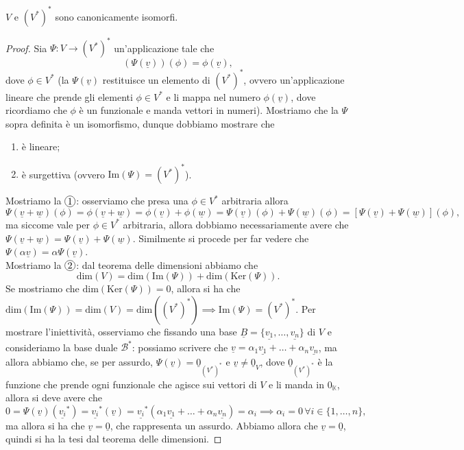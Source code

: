 \begin{theorem}
    $V$ e $(V^*)^*$ sono canonicamente isomorfi.
\end{theorem}
\begin{proof}
    Sia $\Psi: V \to (V^*)^*$ un'applicazione tale che
    $$
        (\Psi(\underline{v}))(\phi) = \phi(\underline{v}),
    $$
    dove $\phi \in V^*$ (la $\Psi(\underline{v})$ restituisce un elemento di $(V^*)^*$, ovvero un'applicazione lineare che prende gli elementi $\phi \in V^*$ e li mappa nel numero $\phi(\underline{v})$, dove ricordiamo che $\phi$ è un funzionale e manda vettori in numeri). Mostriamo che la $\Psi$ sopra definita è un isomorfismo, dunque dobbiamo mostrare che
    \begin{enumerate}[label=\protect\circled{\arabic*}]
        \item è lineare;
        \item è surgettiva (ovvero $\text{Im}(\Psi) = (V^*)^*$).
    \end{enumerate} 
    Mostriamo la $\circled{1}$: osserviamo che presa una $\phi \in V^*$ arbitraria allora
    $$
        \Psi(\underline{v} + \underline{w})(\phi) = \phi(\underline{v} + \underline{w}) = \phi(\underline{v}) + \phi(\underline{w}) = \Psi(\underline{v})(\phi) + \Psi(\underline{w})(\phi) = [\Psi(\underline{v}) + \Psi(\underline{w})](\phi),
    $$
    ma siccome vale per $\phi \in V^*$ arbitraria, allora dobbiamo necessariamente avere che $\Psi(\underline{v} + \underline{w}) = \Psi(\underline{v}) + \Psi(\underline{w}).$ Similmente si procede per far vedere che $\Psi(\alpha \underline{v}) = \alpha \Psi(\underline{v})$. \\
    Mostriamo la $\circled{2}$: dal teorema delle dimensioni abbiamo che
    $$
        \text{dim}(V) = \text{dim}(\text{Im}(\Psi)) + \text{dim}(\text{Ker}(\Psi)).
    $$
    Se mostriamo che $\text{dim}(\text{Ker}(\Psi)) = 0$, allora si ha che $\text{dim}(\text{Im}(\Psi)) = \text{dim}(V) = \text{dim}((V^*)^*) \implies \text{Im}(\Psi) = (V^*)^*$. Per mostrare l'iniettività, osserviamo che fissando una base $\underline{B} = \{ \underline{v_1}, \ldots, \underline{v_n} \}$ di $V$ e consideriamo la base duale $\mathcal{B}^*$: possiamo scrivere che $\underline{v} = \alpha_1 \underline{v_1} + \ldots + \alpha_n \underline{v_n}$,
    ma allora abbiamo che, se per assurdo, $\Psi(\underline{v}) = \underline{0}_{(V^*)^*}$ e $\underline{v} \neq \underline{0}_V$, dove $\underline{0}_{(V^*)^*}$ è la funzione che prende ogni funzionale che agisce sui vettori di $V$ e li manda in $0_\mathbb{K}$, allora si deve avere che
    $$
        0 = \Psi(\underline{v})(\underline{v_i}^*) = \underline{v_i}^*(\underline{v}) = \underline{v_i}^*(\alpha_1 \underline{v_1} + \ldots + \alpha_n \underline{v_n}) = \alpha_i \implies \alpha_i = 0 \, \forall i \in \{ 1, \ldots, n \},
    $$
    ma allora si ha che $\underline{v} = \underline{0}$, che rappresenta un assurdo. Abbiamo allora che $\underline{v} = \underline{0}$, quindi si ha la tesi dal teorema delle dimensioni.
\end{proof}


